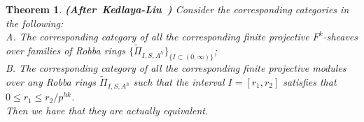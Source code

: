 \documentclass[12pt]{amsart}
\newtheorem{theorem}{Theorem}[section]
\theoremstyle{definition}
\numberwithin{equation}{section}
\begin{document}
\begin{theorem}\mbox{\bf{(After Kedlaya-Liu \cite[Theorem 4.6.1]{KL2})}}
Consider the corresponding categories in the following:\\
A. The corresponding category of all the corresponding finite projective $F^k$-sheaves over families of Robba rings $\{\widetilde{\Pi}_{I,S,A^h}\}_{\{I\subset (0,\infty)\}}$;\\
B. The corresponding category of all the corresponding finite projective modules over any Robba rings $\widetilde{\Pi}_{I,S,A^h}$ such that the interval $I=[r_1,r_2]$ satisfies that $0\leq r_1 \leq r_2/p^{hk}$.\\
Then we have that they are actually equivalent.


\end{theorem}
\end{document}

